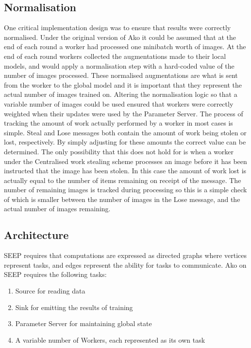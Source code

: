 \documentclass[12pt]{article}
\begin{document}
\subsection{Normalisation}

One critical implementation design was to ensure that results were correctly normalised. Under the original version of Ako it could be assumed that at the end of each round a worker had processed one minibatch worth of images. At the end of each round workers collected the augmentations made to their local models, and would apply a normalisation step with a hard-coded value of the number of images processed. These normalised augmentations are what is sent from the worker to the global model and it is important that they represent the actual number of images trained on. Altering the normalisation logic so that a variable number of images could be used ensured that workers were correctly weighted when their updates were used by the Parameter Server. The process of tracking the amount of work actually performed by a worker in most cases is simple. Steal and Lose messages both contain the amount of work being stolen or lost, respectively. By simply adjusting for these amounts the correct value can be determined. The only possibility that this does not hold for is when a worker under the Centralised work stealing scheme processes an image before it has been instructed that the image has been stolen. In this case the amount of work lost is actually equal to the number of items remaining on receipt of the message. The number of remaining images is tracked during processing so this is a simple check of which is smaller between the number of images in the Lose message, and the actual number of images remaining.

\subsection{Architecture}
SEEP requires that computations are expressed as directed graphs where vertices represent tasks, and edges represent the ability for tasks to communicate. Ako on SEEP requires the following tasks:

\begin{enumerate}
\item Source for reading data
\item Sink for emitting the results of training
\item Parameter Server for maintaining global state
\item A variable number of Workers, each represented as its own task
\end{enumerate}
\end{document}

